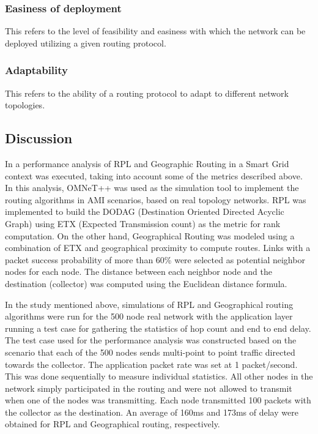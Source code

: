 \documentclass[11pt,draftclsnofoot,onecolumn]{IEEEtran}
\begin{document}
\subsubsection{Easiness of deployment}
This refers to the level of feasibility and easiness with which the network can be deployed utilizing a given routing protocol.  

\subsubsection{Adaptability}
This refers to the ability of a routing protocol to adapt to different network topologies. 

\subsection{Discussion}

In \cite{Iyer2011a} a performance analysis of RPL and Geographic Routing in a Smart Grid context was executed, taking into account some of the metrics described above. In this analysis,  OMNeT++ was used as the simulation tool to implement the routing algorithms in AMI scenarios, based on real topology networks. RPL was implemented to build the DODAG (Destination Oriented Directed Acyclic Graph) using ETX (Expected Transmission count) as the metric for rank computation. On the other hand, Geographical Routing was modeled using a combination of ETX and geographical proximity to compute routes. Links with a packet success probability of more than 60\% were selected as potential neighbor nodes for each node. The distance between each neighbor node and the destination (collector) was computed using the Euclidean distance formula.  

In the study mentioned above, simulations of RPL and Geographical routing algorithms were run for the 500 node real network with the application layer running a test case for gathering the statistics of hop count and end to end delay. The test case used for the performance analysis was constructed based on the scenario that each of the 500 nodes sends multi-point to point traffic directed towards the collector. The application packet rate was set at 1 packet/second. This was done sequentially to measure individual statistics. All other nodes in the network simply participated in the routing and were not allowed to transmit when one of the nodes was transmitting. Each node transmitted 100 packets with the collector as the destination. An average of 160ms and 173ms of delay were obtained for RPL and Geographical routing, respectively. 
\end{document}
